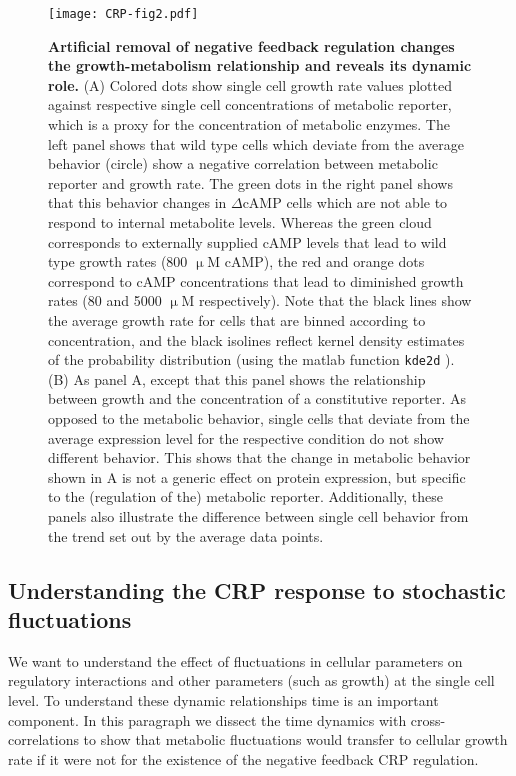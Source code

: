 \begin{figure}
	\centering
	\texttt{[image: CRP-fig2.pdf]}
	\caption{ 
		\textbf{Artificial removal of negative feedback regulation changes the growth-metabolism relationship and reveals its dynamic role.}		
		(A) Colored dots show single cell growth rate values plotted against respective single cell concentrations of metabolic reporter, which is a proxy for the concentration of metabolic enzymes. 
		The left panel shows that wild type cells which deviate from the average behavior (circle) show a negative correlation between metabolic reporter and growth rate.
		The green dots in the right panel shows that this behavior changes in $\Delta$cAMP cells which are not able to respond to internal metabolite levels. 
		Whereas the green cloud corresponds to externally supplied cAMP levels that lead to wild type growth rates (800 $\upmu$M cAMP), the 
		red and orange dots correspond to cAMP concentrations that lead to diminished growth rates (80 and 5000 $\upmu$M respectively).		
		Note that the black lines show the average growth rate for cells that are binned according to concentration, and the black isolines reflect kernel density estimates of the probability distribution (using the matlab function \texttt{kde2d} \cite{Botev2010}).
		(B) As panel A, except that this panel shows the relationship between growth and the concentration of a constitutive reporter. 
		As opposed to the metabolic behavior, single cells that deviate from the average expression level for the respective condition do not show  different behavior.
		This shows that the change in metabolic behavior shown in A is not a generic effect on protein expression, but specific to the (regulation of the) metabolic reporter.
		Additionally, these panels also illustrate the difference between single cell behavior from the trend set out by the average data points.
	}
	\label{fig:CRP:fig2}
\end{figure}


\subsection*{Understanding the CRP response to stochastic fluctuations}

We want to understand the effect of fluctuations in cellular parameters on regulatory interactions and other parameters (such as growth) at the single cell level.
%
To understand these dynamic relationships time is an important component.
%
%
In this paragraph we dissect the time dynamics with cross-correlations
to show that metabolic fluctuations would transfer to cellular growth rate if it were not for the existence of the negative feedback CRP regulation.

